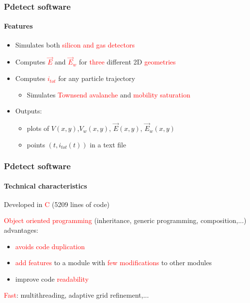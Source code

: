 \documentclass[14pt]{beamer}
\newcommand{\CC}{C\nolinebreak\hspace{-.05em}\raisebox{.4ex}{\tiny\bf +}\nolinebreak\hspace{-.10em}\raisebox{.4ex}{\tiny\bf +}}
\begin{document}
\begin{frame}
  \frametitle{Pdetect software}
  \framesubtitle{Features}

\begin{itemize}
  \item Simulates both \textcolor{red}{silicon and gas detectors}
  \item Computes \textcolor{red}{$\vec{E}$} and \textcolor{red}{$\vec{E}_w$}
  for \textcolor{red}{three} different 2D \textcolor{red}{geometries}
  \item Computes \textcolor{red}{$i_{tot}$} for any particle trajectory
  \begin{itemize}
  \item Simulates \textcolor{red}{Townsend avalanche} and \textcolor{red}{mobility saturation}
  \end{itemize}
  \item Outputs:
  \begin{itemize}
      \item plots of $V(x,y)$,$V_w(x,y)$, $\vec{E}(x,y)$, $\vec{E}_w(x,y)$
      \item points $(t,i_{tot}(t))$ in a text file
  \end{itemize}
\end{itemize}

\end{frame}

\begin{frame}
  \frametitle{Pdetect software}
  \framesubtitle{Technical characteristics}

  Developed in \textcolor{red}{\CC} (5209 lines of code)
\newline

\textcolor{red}{Object oriented programming} (inheritance, generic programming,
composition,...) advantages:


\begin{itemize}
  \item \textcolor{red}{avoids code duplication}
  \item \textcolor{red}{add features} to a module with \textcolor{red}{few modifications} to other
  modules
  \item improve code \textcolor{red}{readability}
  \newline
\end{itemize}

\textcolor{red}{Fast}: multithreading, adaptive grid refinement,...

\end{frame}
\end{document}
